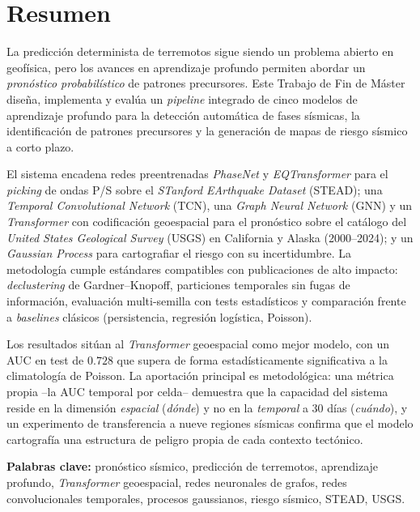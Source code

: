 \cleardoublepage

\chapter*{Resumen}
\label{resumen}

La predicción determinista de terremotos sigue siendo un problema abierto en geofísica, pero los avances en aprendizaje profundo permiten abordar un \emph{pronóstico probabilístico} de patrones precursores. Este Trabajo de Fin de Máster diseña, implementa y evalúa un \emph{pipeline} integrado de cinco modelos de aprendizaje profundo para la detección automática de fases sísmicas, la identificación de patrones precursores y la generación de mapas de riesgo sísmico a corto plazo.

El sistema encadena redes preentrenadas \textit{PhaseNet} y \textit{EQTransformer} para el \textit{picking} de ondas P/S sobre el \textit{STanford EArthquake Dataset} (STEAD); una \textit{Temporal Convolutional Network} (TCN), una \textit{Graph Neural Network} (GNN) y un \textit{Transformer} con codificación geoespacial para el pronóstico sobre el catálogo del \textit{United States Geological Survey} (USGS) en California y Alaska (2000--2024); y un \textit{Gaussian Process} para cartografiar el riesgo con su incertidumbre. La metodología cumple estándares compatibles con publicaciones de alto impacto: \textit{declustering} de Gardner--Knopoff, particiones temporales sin fugas de información, evaluación multi-semilla con tests estadísticos y comparación frente a \textit{baselines} clásicos (persistencia, regresión logística, Poisson).

Los resultados sitúan al \textit{Transformer} geoespacial como mejor modelo, con un AUC en test de \(0.728\) que supera de forma estadísticamente significativa a la climatología de Poisson. La aportación principal es metodológica: una métrica propia --la AUC temporal por celda-- demuestra que la capacidad del sistema reside en la dimensión \emph{espacial} (\emph{dónde}) y no en la \emph{temporal} a 30 días (\emph{cuándo}), y un experimento de transferencia a nueve regiones sísmicas confirma que el modelo cartografía una estructura de peligro propia de cada contexto tectónico.

\medskip
\noindent\textbf{Palabras clave:} pronóstico sísmico, predicción de terremotos, aprendizaje profundo, \textit{Transformer} geoespacial, redes neuronales de grafos, redes convolucionales temporales, procesos gaussianos, riesgo sísmico, STEAD, USGS.
